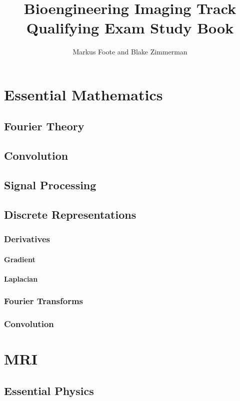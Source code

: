 \documentclass{book}
\title{Bioengineering Imaging Track Qualifying Exam Study Book}
\author{Markus Foote and Blake Zimmerman}
\begin{document}
	\maketitle
	\tableofcontents
		\part{Essential Mathematics}
			\chapter{Fourier Theory} 
			\chapter{Convolution} 
			\chapter{Signal Processing} 
			\chapter{Discrete Representations}
				\section{Derivatives}
					\subsection{Gradient}
					\subsection{Laplacian}
				\section{Fourier Transforms}
				\section{Convolution}
				
		\part{MRI}
			\chapter{Essential Physics}
\end{document}
